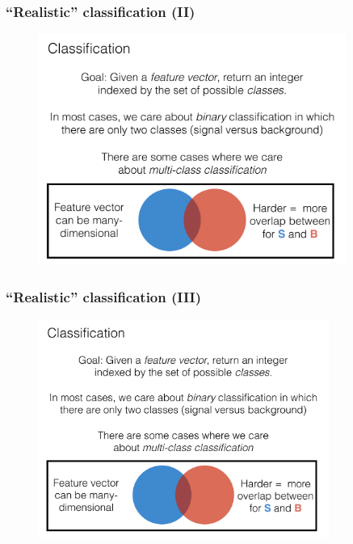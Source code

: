 \documentclass[hyperref={colorlinks=true}]{beamer}
\begin{document}
\begin{frame}%
  \frametitle{``Realistic'' classification (II)}

  \vspace{-0.0cm}

  \begin{figure}
    \centering 
    \includegraphics[width=0.9\textwidth,page=11]{ClassifierSlides.pdf}
  \end{figure}

    
\end{frame}


\begin{frame}%
  \frametitle{``Realistic'' classification (III)}

  \vspace{-0.0cm}

  \begin{figure}
    \centering 
    \includegraphics[width=0.85\textwidth,page=12]{ClassifierSlides.pdf}
  \end{figure}

    
\end{frame}
  
\end{document}
